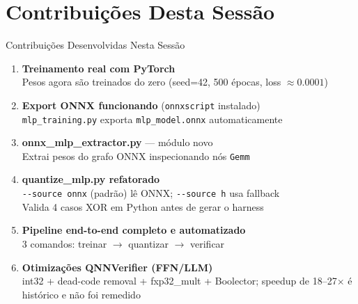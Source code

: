 \documentclass[aspectratio=169]{beamer}
\begin{document}
\section{Contribuições Desta Sessão}

\begin{frame}{Contribuições Desenvolvidas Nesta Sessão}
  \begin{enumerate}
    \item \textbf{Treinamento real com PyTorch}\\
          Pesos agora são treinados do zero (seed=42, 500 épocas, loss $\approx 0.0001$)

    \vspace{0.3em}
    \item \textbf{Export ONNX funcionando} (\texttt{onnxscript} instalado)\\
          \texttt{mlp\_training.py} exporta \texttt{mlp\_model.onnx} automaticamente

    \vspace{0.3em}
    \item \textbf{onnx\_mlp\_extractor.py} --- módulo novo\\
          Extrai pesos do grafo ONNX inspecionando nós \texttt{Gemm}

    \vspace{0.3em}
    \item \textbf{quantize\_mlp.py refatorado}\\
          \texttt{-{}-source onnx} (padrão) lê ONNX; \texttt{-{}-source h} usa fallback\\
          Valida 4 casos XOR em Python antes de gerar o harness

    \vspace{0.3em}
    \item \textbf{Pipeline end-to-end completo e automatizado}\\
          3 comandos: treinar $\to$ quantizar $\to$ verificar

    \vspace{0.3em}
    \item \textbf{Otimizações QNNVerifier (FFN/LLM)}\\
          int32 + dead-code removal + fxp32\_mult + Boolector; speedup de 18--27$\times$ é histórico e não foi remedido
  \end{enumerate}
\end{frame}
\end{document}
